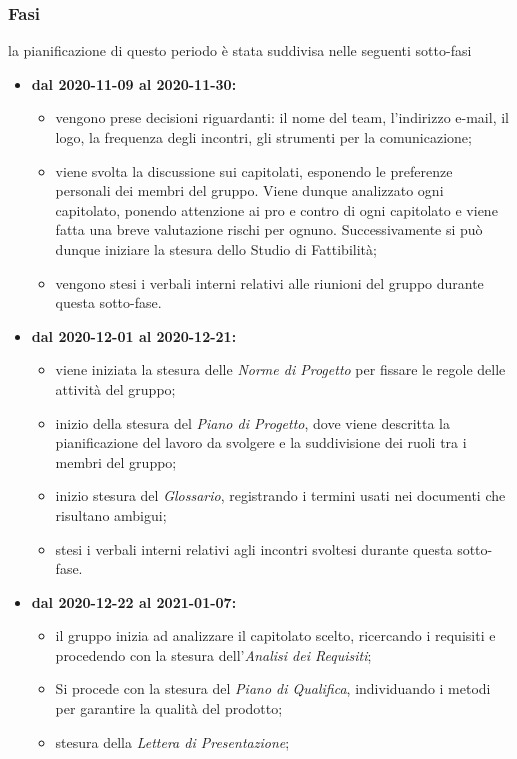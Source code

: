 \subsubsection{Fasi}
la pianificazione di questo periodo è stata suddivisa nelle seguenti sotto-fasi
\begin{itemize}
	\item \textbf{dal 2020-11-09 al 2020-11-30:}
	\begin{itemize}
	\item vengono prese decisioni riguardanti: il nome del team, l'indirizzo e-mail, il logo, la frequenza degli incontri, gli strumenti per la comunicazione;
	\item viene svolta la discussione sui capitolati, esponendo le preferenze personali dei membri del gruppo. Viene dunque analizzato ogni capitolato, ponendo attenzione ai pro e contro di ogni capitolato e viene fatta una breve valutazione rischi per ognuno. Successivamente si può dunque iniziare la stesura dello Studio di Fattibilità;
	\item vengono stesi i verbali interni relativi alle riunioni del gruppo durante questa sotto-fase.
	\end{itemize}
	\item \textbf{dal 2020-12-01 al 2020-12-21:}
	\begin{itemize}
		\item viene iniziata la stesura delle \textit{Norme di Progetto} per fissare le regole delle attività del gruppo;
		\item inizio della stesura del \textit{Piano di Progetto}, dove viene descritta la pianificazione del lavoro da svolgere e la suddivisione dei ruoli tra i membri del gruppo;
		\item inizio stesura del \textit{Glossario}, registrando i termini usati nei documenti che risultano ambigui;
		\item stesi i verbali interni relativi agli incontri svoltesi durante questa sotto-fase.
	\end{itemize}
	\item \textbf{dal 2020-12-22 al 2021-01-07:}
	\begin{itemize}
		\item il gruppo inizia ad analizzare il capitolato scelto, ricercando i requisiti e procedendo con la stesura dell'\textit{Analisi dei Requisiti};
		\item Si procede con la stesura del \textit{Piano di Qualifica}, individuando i metodi per garantire la qualità del prodotto;
		\item stesura della \textit{Lettera di Presentazione};

\end{itemize}
\end{itemize}
